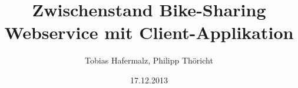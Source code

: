 \author{Tobias Hafermalz, Philipp Thöricht}
\title{Zwischenstand Bike-Sharing Webservice mit Client-Applikation}
\date{17.12.2013}
\maketitle
